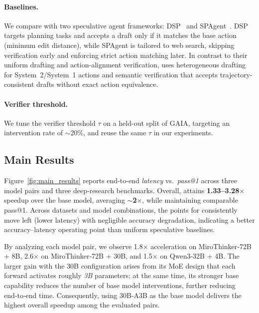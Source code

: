 \paragraph{Baselines.}

We compare with two speculative agent frameworks: DSP~\cite{guan2025dynamic} and SPAgent~\cite{huang2025reducing}.
DSP targets planning tasks and accepts a draft only if it matches the base action (minimum edit distance),
while SPAgent is tailored to web search, skipping verification early and enforcing strict action matching later.
In contrast to their uniform drafting and action-alignment verification, \method{} uses heterogeneous drafting for System~2/System~1 actions and semantic verification that accepts trajectory-consistent drafts without exact action equivalence.

\paragraph{Verifier threshold.}
We tune the verifier threshold $\tau$ on a held-out split of GAIA, targeting an intervention rate of $\sim$20\%,
and reuse the same $\tau$ in our experiments.

\subsection{Main Results}

Figure~\ref{fig:main_results} reports end-to-end \emph{latency} vs.\ \emph{pass@1} across three model pairs and three deep‑research benchmarks. 
Overall, \method{} attains \textbf{1.33–3.28$\times$} speedup over the base model, averaging \textbf{$\sim$2$\times$}, while maintaining comparable pass@1.
Across datasets and model combinations, the points for \method{} consistently move left (lower latency) with negligible accuracy degradation, indicating a better accuracy–latency operating point than uniform speculative baselines.

By analyzing each model pair, we observe 1.8$\times$ acceleration on MiroThinker‑72B + 8B, 2.6$\times$ on MiroThinker‑72B + 30B, and 1.5$\times$ on Qwen3‑32B + 4B.
The larger gain with the 30B configuration arises from its MoE design that each forward activates roughly \emph{3B} parameters; at the same time, its stronger base capability reduces the number of base model interventions, further reducing end‑to‑end time.
Consequently, using 30B‑A3B as the base model delivers the highest overall speedup among the evaluated pairs.


